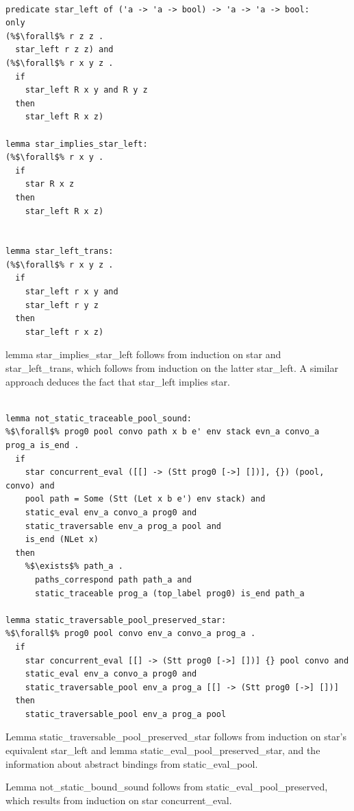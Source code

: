 \documentclass{article}
\begin{document}
\begin{lstlisting}[language=logic, escapechar=\%]

predicate star_left of ('a -> 'a -> bool) -> 'a -> 'a -> bool:
only
(%$\forall$% r z z .
  star_left r z z) and
(%$\forall$% r x y z .
  if
    star_left R x y and R y z
  then
    star_left R x z)

lemma star_implies_star_left:
(%$\forall$% r x y .
  if
    star R x z
  then
    star_left R x z)


lemma star_left_trans:
(%$\forall$% r x y z .
  if 
    star_left r x y and
    star_left r y z 
  then
    star_left r x z)

\end{lstlisting}

lemma star\_implies\_star\_left follows from induction on star and star\_left\_trans,
which follows from induction on the latter star\_left.  A similar approach deduces the
fact that star\_left implies star.

\begin{lstlisting}[language=logic, escapechar=\%]

lemma not_static_traceable_pool_sound:
%$\forall$% prog0 pool convo path x b e' env stack evn_a convo_a prog_a is_end .
  if
    star concurrent_eval ([[] -> (Stt prog0 [->] [])], {}) (pool, convo) and 
    pool path = Some (Stt (Let x b e') env stack) and 
    static_eval env_a convo_a prog0 and 
    static_traversable env_a prog_a pool and 
    is_end (NLet x)
  then
    %$\exists$% path_a . 
      paths_correspond path path_a and 
      static_traceable prog_a (top_label prog0) is_end path_a

lemma static_traversable_pool_preserved_star:
%$\forall$% prog0 pool convo env_a convo_a prog_a .
  if
    star concurrent_eval [[] -> (Stt prog0 [->] [])] {} pool convo and 
    static_eval env_a convo_a prog0 and
    static_traversable_pool env_a prog_a [[] -> (Stt prog0 [->] [])]
  then
    static_traversable_pool env_a prog_a pool 

\end{lstlisting}


Lemma static\_traversable\_pool\_preserved\_star follows from induction on star's equivalent
star\_left and lemma static\_eval\_pool\_preserved\_star, and the information about abstract
bindings from static\_eval\_pool.


Lemma not\_static\_bound\_sound follows from static\_eval\_pool\_preserved, which results from
induction on star concurrent\_eval.
\end{document}
